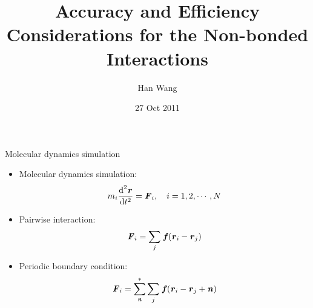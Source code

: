 \documentclass{beamer}
\newcommand{\bluec}[1]{{\color{blue} #1}}
\renewcommand{\v}[1]{\textbf{\textit{#1}}}
\renewcommand{\d}[1]{\textrm{#1}}
\begin{document}
\title[]{Accuracy and Efficiency Considerations  for the Non-bonded Interactions}
%
\author{Han Wang}
\date[27 Oct 2011]{27 Oct 2011}
\frame{\titlepage}


\begin{frame}{Molecular dynamics simulation}
  \begin{itemize}\itemsep -10pt
  \item<1-> Molecular dynamics simulation:
    \bluec{
      \begin{align*}
        m_i \frac{\d d^2\v r}{\d dt^2} = \v F_i, \quad i = 1, 2, \cdots, N
      \end{align*}
    }
  \item<2-> Pairwise interaction:
    \bluec{
      \begin{align*}
        \v F_i = \sum_{j}\, \v f(\v r_i - \v r_j)
      \end{align*}}
  \item<3-> Periodic boundary condition:
    \bluec{
      \begin{align*}
        \v F_i = \sum_{\v n}^\ast\sum_{j}\, \v f(\v r_i - \v r_j + \v n)
      \end{align*}}
  \end{itemize}
\end{frame}
\end{document}

